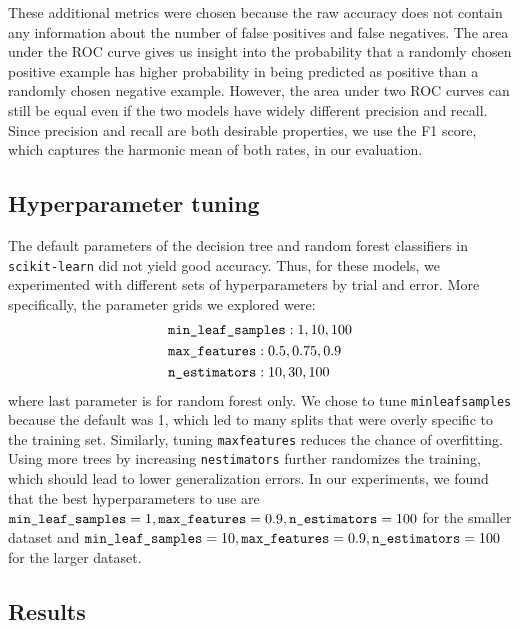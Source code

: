 \documentclass{article} %
\begin{document}
These additional metrics were chosen because the raw accuracy does not contain any information about the number of false positives and false negatives. The area under the ROC curve gives us insight into the probability that a randomly chosen positive example has higher probability in being predicted as positive than a randomly chosen negative example. However, the area under two ROC curves can still be equal even if the two models have widely different precision and recall. Since precision and recall are both desirable properties, we use the F1 score, which captures the harmonic mean of both rates, in our evaluation.

\subsection{Hyperparameter tuning}

The default parameters of the decision tree and random forest classifiers in \texttt{scikit-learn} did not yield good accuracy. Thus, for these models, we experimented with different sets of hyperparameters by trial and error. More specifically, the parameter grids we explored were:
\begin{align*}
&\texttt{min\textunderscore leaf\textunderscore samples}: 1, 10, 100\\
&\texttt{max\textunderscore features}: 0.5, 0.75, 0.9\\
&\texttt{n\textunderscore estimators}: 10, 30, 100
\end{align*}
where last parameter is for random forest only. We chose to tune \texttt{min\textunderscore leaf\textunderscore samples} because the default was 1, which led to many splits that were overly specific to the training set. Similarly, tuning \texttt{max\textunderscore features} reduces the chance of overfitting. Using more trees by increasing \texttt{n\textunderscore estimators} further randomizes the training, which should lead to lower generalization errors. In our experiments, we found that the best hyperparameters to use are $\texttt{min\textunderscore leaf\textunderscore samples} = 1, \texttt{max\textunderscore features} = 0.9, \texttt{n\textunderscore estimators} = 100$ for the smaller dataset and $\texttt{min\textunderscore leaf\textunderscore samples} = 10, \texttt{max\textunderscore features} = 0.9, \texttt{n\textunderscore estimators} = 100$ for the larger dataset.

\subsection{Results}
\end{document}

